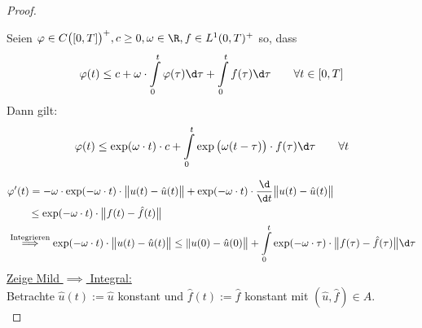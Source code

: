 \begin{proof}
\begin{lemma}[Gronwall]\label{lemmaGronwall}\enter
Seien $\varphi\in C\big([0,T]\big)^+,c\geq 0,\omega\in\R,f\in L^1(0,T)^+$ so, dass
\begin{align*}
\varphi(t)\leq c+\omega\cdot\int\limits_0^t\varphi(\tau)\d\tau+\int\limits_0^t f(\tau)\d\tau\qquad\forall t\in[0,T]
\end{align*}
Dann gilt:
\begin{align*}
\varphi(t)\leq\exp(\omega\cdot t)\cdot c+\int\limits_0^t\exp\big(\omega(t-\tau)\big)\cdot f(\tau)\d\tau\qquad\forall t
\end{align*}
\end{lemma}
\begin{align*}
&\varphi'(t)=-\omega\cdot\exp(-\omega\cdot t)\cdot\big\Vert u(t)-\hat{u}(t)\big\Vert
+\exp(-\omega\cdot t)\cdot\frac{\d}{\d t}\big\Vert u(t)-\hat{u}(t)\big\Vert\\
&\qquad\stackrel{}{\leq}
\exp(-\omega\cdot t)\cdot\big\Vert f(t)-\hat{f}(t)\big\Vert\\
&\stackrel{\text{Integrieren}}{\implies}
\exp(-\omega\cdot t)\cdot\big\Vert u(t)-\hat{u}(t)\big\Vert
\leq\Vert u(0)-\hat{u}(0)\big\Vert+\int\limits_0^t\exp(-\omega\cdot\tau)\cdot\big\Vert f(\tau)-\hat{f}(\tau)\big\Vert\d\tau
\end{align*}
\underline{Zeige Mild $\implies$ Integral:}\\
Betrachte $\hat{u}(t):=\hat{u}$ konstant und $\hat{f}(t):=\hat{f}$ konstant mit $(\hat{u},\hat{f})\in A$.\\ 


\end{proof}
